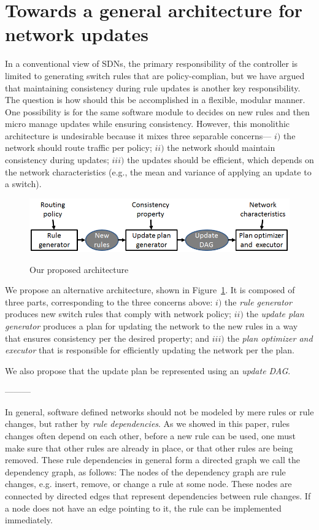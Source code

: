 \section{Towards a general architecture for network updates}
\label{sec:discussion}

In a conventional view of SDNs, the primary responsibility of the controller is limited to generating switch rules that are policy-complian, but we have argued that maintaining consistency during rule updates is another key responsibility. The question is how should this be accomplished in a flexible, modular manner. One possibility is for the same software module to decides on new rules and then micro manage updates while ensuring consistency. However, this monolithic architecture is undesirable because it mixes three separable concerns--- $i)$ the network should route traffic per policy; $ii)$ the network should maintain consistency during updates; $iii)$ the updates should be efficient, which depends on the network characteristics (e.g., the mean and variance of applying an update to a switch).

\begin{figure}[t!]
  \centering
  \includegraphics[width=\columnwidth]{figures/arch.png}\\
  \caption{Our proposed architecture}\label{fig:arch}
\end{figure}

We propose an alternative architecture, shown in Figure~\ref{fig:arch}. It is composed of three parts, corresponding to the three concerns above: $i)$ the {\em rule generator} produces new switch rules that comply with network policy; $ii)$ the {\em update plan generator} produces a plan for updating the network to the new rules in a way that ensures consistency per the desired property; and $iii)$  the {\em plan optimizer and executor} that is responsible for efficiently updating the network per the plan.

We also propose that the update plan be represented using an {\em update DAG}. 

---------

In general, software defined networks should not be modeled by mere rules or rule changes, but rather by \emph{rule dependencies}. As we showed in this paper, rules changes often depend on each other, before a new rule can be used, one must make sure that other rules are already in place, or that other rules are being removed. These rule dependencies in general form a directed graph we call the dependency graph, as follows: The nodes of the dependency graph are rule changes, e.g. insert, remove, or change a rule at some node. These nodes are connected by directed edges that represent dependencies between rule changes. If a node does not have an edge pointing to it, the rule can be implemented immediately.

